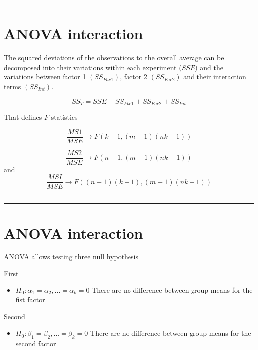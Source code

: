 \documentclass[
]{book}
\providecommand{\tightlist}{%
  \setlength{\itemsep}{0pt}\setlength{\parskip}{0pt}}
\begin{document}
\begin{center}\rule{0.5\linewidth}{0.5pt}\end{center}

\hypertarget{anova-interaction-3}{%
\section{ANOVA interaction}\label{anova-interaction-3}}

The squared deviations of the observations to the overall average can be decomposed into their variations within each experiment (\(SSE\)) and the variations between factor 1 \((SS_{Fac1})\), factor 2 \((SS_{Fac2})\) and their interaction terms \((SS_{Int})\).

\[SS_T= SSE + SS_{Fac1} + SS_{Fac2}+ SS_{Int}\]

That defines \(F\) statistics

\[\frac{MS1}{MSE} \rightarrow F(k-1,(m-1)(nk-1))\]

\[\frac{MS2}{MSE}\rightarrow F(n-1,(m-1)(nk-1))\]
and
\[\frac{MSI}{MSE}\rightarrow F((n-1)(k-1),(m-1)(nk-1))\]

\begin{center}\rule{0.5\linewidth}{0.5pt}\end{center}

\begin{center}\rule{0.5\linewidth}{0.5pt}\end{center}

\hypertarget{anova-interaction-4}{%
\section{ANOVA interaction}\label{anova-interaction-4}}

ANOVA allows testing three null hypothesis

First

\begin{itemize}
\tightlist
\item
  \(H_0: \alpha_1=\alpha_2, ...=\alpha_k=0\) There are no difference between group means for the fist factor
\end{itemize}

Second

\begin{itemize}
\tightlist
\item
  \(H_0: \beta_1=\beta_2, ...=\beta_k=0\) There are no difference between group means for the second factor
\end{itemize}
\end{document}
